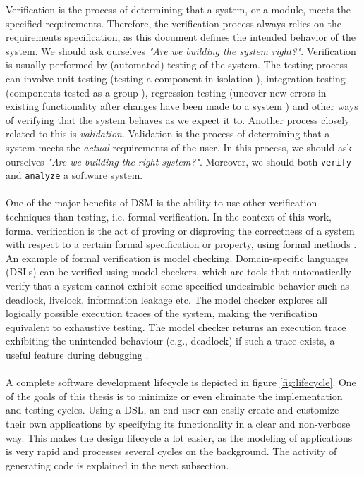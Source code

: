 Verification is the process of determining that a system, or a module, meets the specified requirements. Therefore, the verification process always relies on the requirements specification, as this document defines the intended behavior of the system. We should ask ourselves \textit{"Are we building the system right?"}. Verification is usually performed by (automated) testing of the system. The testing process can involve unit testing (testing a component in isolation \cite{UnitTesting}), integration testing (components tested as a group \cite{IntegrationTesting}), regression testing (uncover new errors in existing functionality after changes have been made to a system \cite{RegressionTesting}) and other ways of verifying that the system behaves as we expect it to. Another process closely related to this is \textit{validation}. Validation is the process of determining that a system meets the \textit{actual} requirements of the user. In this process, we should ask ourselves \textit{"Are we building the right system?"}. Moreover, we should both \texttt{verify} and \texttt{analyze} a software system. \\ \\
One of the major benefits of DSM is the ability to use other verification techniques than testing, i.e. formal verification. In the context of this work, formal verification is the act of proving or disproving the  correctness of a system with respect to a certain formal specification or property, using formal methods  \cite{FormalSpec}. An example of formal verification is model checking. Domain-specific languages (DSLs) can be verified using model checkers, which are tools that automatically verify that a system cannot exhibit some specified undesirable behavior such as deadlock, livelock, information leakage etc. The model checker explores all logically possible execution traces of the system, making the verification equivalent to exhaustive testing. The model checker returns an execution trace exhibiting the unintended behaviour  (e.g., deadlock) if such a 
trace exists, a useful feature during debugging \cite{ModelChecking}. \\ \\
A complete software development lifecycle is depicted in figure \ref{fig:lifecycle}. One of the goals of this thesis is to minimize or even eliminate the implementation and testing cycles. Using a DSL, an end-user can easily create and customize their own applications by specifying its functionality in a clear and non-verbose way. This makes the design lifecycle a lot easier, as the modeling of applications is very rapid and processes several cycles on the background. The activity of generating code is explained in the next subsection.

